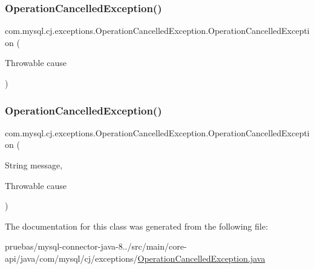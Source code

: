 \subsubsection{\texorpdfstring{Operation\+Cancelled\+Exception()}{OperationCancelledException()}\hspace{0.1cm}{\footnotesize\ttfamily [3/4]}}
{\footnotesize\ttfamily com.\+mysql.\+cj.\+exceptions.\+Operation\+Cancelled\+Exception.\+Operation\+Cancelled\+Exception (\begin{DoxyParamCaption}\item[{Throwable}]{cause }\end{DoxyParamCaption})}

\mbox{\label{classcom_1_1mysql_1_1cj_1_1exceptions_1_1_operation_cancelled_exception_ad03b2b5c0bbee8a9cd0f3f50bd317eb3}} 
\subsubsection{\texorpdfstring{Operation\+Cancelled\+Exception()}{OperationCancelledException()}\hspace{0.1cm}{\footnotesize\ttfamily [4/4]}}
{\footnotesize\ttfamily com.\+mysql.\+cj.\+exceptions.\+Operation\+Cancelled\+Exception.\+Operation\+Cancelled\+Exception (\begin{DoxyParamCaption}\item[{String}]{message,  }\item[{Throwable}]{cause }\end{DoxyParamCaption})}



The documentation for this class was generated from the following file\+:\begin{DoxyCompactItemize}
\item 
pruebas/mysql-\/connector-\/java-\/8../src/main/core-\/api/java/com/mysql/cj/exceptions/\mbox{\hyperlink{_operation_cancelled_exception_8java}{Operation\+Cancelled\+Exception.\+java}}\end{DoxyCompactItemize}
